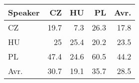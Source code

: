 \begin{tabular}{l|rrr|r}
\hline
 Speaker   &   CZ &   HU &   PL &   Avr. \\
\hline
 CZ        & 19.7 &  7.3 & 26.3 &   17.8 \\
 HU        & 25   & 25.4 & 20.2 &   23.5 \\
 PL        & 47.4 & 24.6 & 60.5 &   44.2 \\
\hline
 Avr.     & 30.7 & 19.1 & 35.7 &   28.5 \\
\hline
\end{tabular}